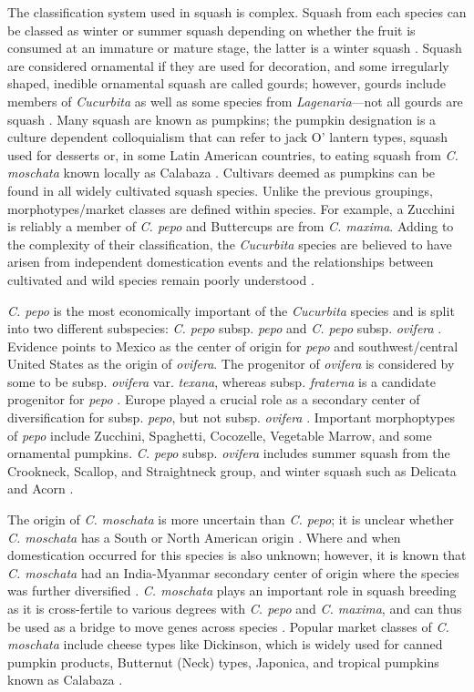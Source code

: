\documentclass[utf8]{FrontiersinHarvard} %
\begin{document}
The classification system used in squash is complex.
Squash from each species can be classed as winter or summer squash depending on whether the fruit is consumed at an immature or mature stage, the latter is a winter squash \citep{Loy2004}.
Squash are considered ornamental if they are used for decoration, and some irregularly shaped, inedible ornamental squash are called gourds; however, gourds include members of \emph{Cucurbita} as well as some species from \emph{Lagenaria}---not all gourds are squash \citep{Paris2015}.
Many squash are known as pumpkins; the pumpkin designation is a culture dependent colloquialism that can refer to jack O' lantern types, squash used for desserts or, in some Latin American countries, to eating squash from \emph{C. moschata} known locally as Calabaza \citep{Ferriol}.
Cultivars deemed as pumpkins can be found in all widely cultivated squash species.
Unlike the previous groupings, morphotypes/market classes are defined within species.
For example, a Zucchini is reliably a member of \emph{C. pepo} and Buttercups are from \emph{C. maxima}.
Adding to the complexity of their classification, the \emph{Cucurbita} species are believed to have arisen from independent domestication events and the relationships between cultivated and wild species remain poorly understood \citep{Kates2017}.

\emph{C. pepo} is the most economically important of the \emph{Cucurbita} species and is split into two different subspecies: \emph{C. pepo} subsp. \emph{pepo} and \emph{C. pepo} subsp. \emph{ovifera} \citep{Xanthopoulou2019}.
Evidence points to Mexico as the center of origin for \emph{pepo} and southwest/central United States as the origin of \emph{ovifera}. The progenitor of \emph{ovifera} is considered by some to be subsp. \emph{ovifera} var. \emph{texana}, whereas subsp. \emph{fraterna} is a candidate progenitor for \emph{pepo} \citep{Kates2017}.
Europe played a crucial role as a secondary center of diversification for subsp. \emph{pepo}, but not subsp. \textit{ovifera} \citep{Lust2016}.
Important morphoptypes of \emph{pepo} include Zucchini, Spaghetti, Cocozelle, Vegetable Marrow, and some ornamental pumpkins.
\emph{C. pepo} subsp. \emph{ovifera} includes summer squash from the Crookneck, Scallop, and Straightneck group, and winter squash such as Delicata and Acorn \citep{Paris2012}.

The origin of \emph{C. moschata} is more uncertain than \emph{C. pepo}; it is unclear whether \emph{C. moschata} has a South or North American origin \citep{Chomicki2020}.
Where and when domestication occurred for this species is also unknown; however, it is known that \emph{C. moschata} had an India-Myanmar secondary center of origin where the species was further diversified \citep{Sun2017}.
\emph{C. moschata} plays an important role in squash breeding as it is cross-fertile to various degrees with \emph{C. pepo} and \emph{C. maxima}, and can thus be used as a bridge to move genes across species \citep{Sun2017}.
Popular market classes of \emph{C. moschata} include cheese types like Dickinson, which is widely used for canned pumpkin products, Butternut (Neck) types, Japonica, and tropical pumpkins known as Calabaza \citep{Ferriol}.
\end{document}
